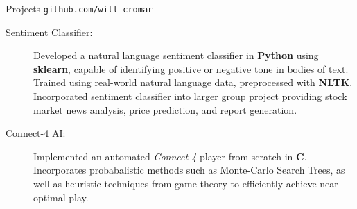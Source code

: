 \documentclass[letterpaper,11pt,oneside]{article}
\newcommand{\resheader}[2][]{
  \vspace{9pt}
  {\LARGE #2} #1
  \\
}
\newcommand{\resskill}[1]{\textbf{#1}}
\begin{document}
\resheader[\hfill \texttt{github.com/will-cromar}]{Projects}
\begin{description}
  \item [Sentiment Classifier:] Developed a natural language sentiment classifier in \resskill{Python} using \resskill{sklearn}, capable of identifying positive or negative tone in bodies of text. Trained using real-world natural language data, preprocessed with \resskill{NLTK}. Incorporated sentiment classifier into larger group project providing stock market news analysis, price prediction, and report generation.
  \item [Connect-4 AI:] Implemented an automated \emph{Connect-4} player from scratch in \resskill{C}. Incorporates probabalistic methods such as Monte-Carlo Search Trees, as well as heuristic techniques from game theory to efficiently achieve near-optimal play.
\end{description}    
\end{document}
